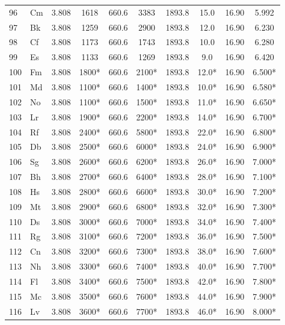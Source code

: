 \documentclass[11pt,a4paper]{article}
\begin{document}
\begin{english}
\begin{longtable}{@{}llcccccccc@{}}
			96 & Cm  & 3.808 & 1618   & 660.6  & 3383   & 1893.8 & 15.0  & 16.90 & 5.992 \\
			97 & Bk  & 3.808 & 1259   & 660.6  & 2900   & 1893.8 & 12.0  & 16.90 & 6.230 \\
			98 & Cf  & 3.808 & 1173   & 660.6  & 1743   & 1893.8 & 10.0  & 16.90 & 6.280 \\
			99 & Es  & 3.808 & 1133   & 660.6  & 1269   & 1893.8 & 9.0   & 16.90 & 6.420 \\
			100& Fm  & 3.808 & 1800*  & 660.6  & 2100*  & 1893.8 & 12.0* & 16.90 & 6.500* \\
			101& Md  & 3.808 & 1100*  & 660.6  & 1400*  & 1893.8 & 10.0* & 16.90 & 6.580* \\
			102& No  & 3.808 & 1100*  & 660.6  & 1500*  & 1893.8 & 11.0* & 16.90 & 6.650* \\
			103& Lr  & 3.808 & 1900*  & 660.6  & 2200*  & 1893.8 & 14.0* & 16.90 & 6.700* \\
			104& Rf  & 3.808 & 2400*  & 660.6  & 5800*  & 1893.8 & 22.0* & 16.90 & 6.800* \\
			105& Db  & 3.808 & 2500*  & 660.6  & 6000*  & 1893.8 & 24.0* & 16.90 & 6.900* \\
			106& Sg  & 3.808 & 2600*  & 660.6  & 6200*  & 1893.8 & 26.0* & 16.90 & 7.000* \\
			107& Bh  & 3.808 & 2700*  & 660.6  & 6400*  & 1893.8 & 28.0* & 16.90 & 7.100* \\
			108& Hs  & 3.808 & 2800*  & 660.6  & 6600*  & 1893.8 & 30.0* & 16.90 & 7.200* \\
			109& Mt  & 3.808 & 2900*  & 660.6  & 6800*  & 1893.8 & 32.0* & 16.90 & 7.300* \\
			110& Ds  & 3.808 & 3000*  & 660.6  & 7000*  & 1893.8 & 34.0* & 16.90 & 7.400* \\
			111& Rg  & 3.808 & 3100*  & 660.6  & 7200*  & 1893.8 & 36.0* & 16.90 & 7.500* \\
			112& Cn  & 3.808 & 3200*  & 660.6  & 7300*  & 1893.8 & 38.0* & 16.90 & 7.600* \\
			113& Nh  & 3.808 & 3300*  & 660.6  & 7400*  & 1893.8 & 40.0* & 16.90 & 7.700* \\
			114& Fl  & 3.808 & 3400*  & 660.6  & 7500*  & 1893.8 & 42.0* & 16.90 & 7.800* \\
			115& Mc  & 3.808 & 3500*  & 660.6  & 7600*  & 1893.8 & 44.0* & 16.90 & 7.900* \\
			116& Lv  & 3.808 & 3600*  & 660.6  & 7700*  & 1893.8 & 46.0* & 16.90 & 8.000* \\

\end{longtable}
\end{english}
\end{document}
